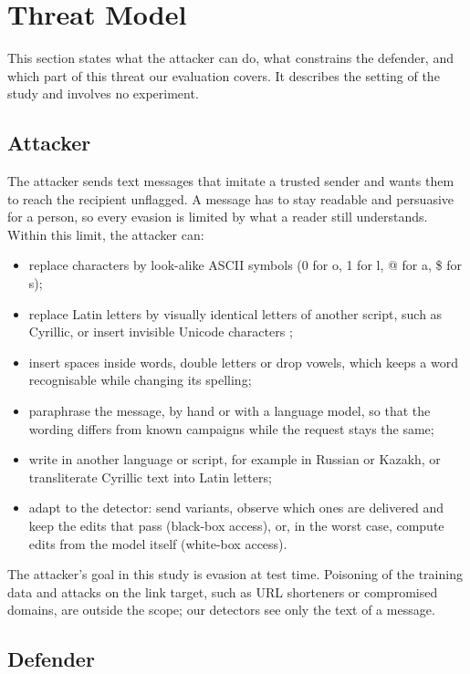 \section{Threat Model}\label{sec:threat}

This section states what the attacker can do, what constrains the defender, and which part of this threat our evaluation covers. It describes the setting of the study and involves no experiment.

\subsection{Attacker}\label{sec:threat-attacker}

The attacker sends text messages that imitate a trusted sender and wants them to reach the recipient unflagged. A message has to stay readable and persuasive for a person, so every evasion is limited by what a reader still understands. Within this limit, the attacker can:
\begin{itemize}
\item replace characters by look-alike ASCII symbols (0 for o, 1 for l, @ for a, \$ for s);
\item replace Latin letters by visually identical letters of another script, such as Cyrillic, or insert invisible Unicode characters \cite{boucher2022};
\item insert spaces inside words, double letters or drop vowels, which keeps a word recognisable while changing its spelling;
\item paraphrase the message, by hand or with a language model, so that the wording differs from known campaigns while the request stays the same;
\item write in another language or script, for example in Russian or Kazakh, or transliterate Cyrillic text into Latin letters;
\item adapt to the detector: send variants, observe which ones are delivered and keep the edits that pass (black-box access), or, in the worst case, compute edits from the model itself (white-box access).
\end{itemize}
The attacker's goal in this study is evasion at test time. Poisoning of the training data \cite{tang2025} and attacks on the link target, such as URL shorteners or compromised domains, are outside the scope; our detectors see only the text of a message.

\subsection{Defender}\label{sec:threat-defender}

